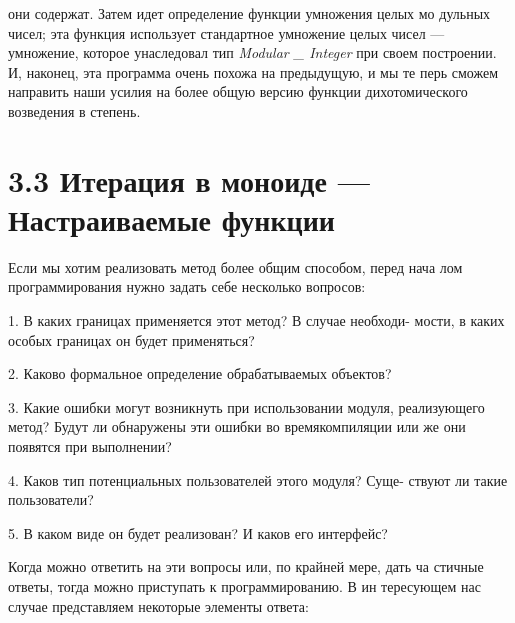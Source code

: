 \documentclass{mai_book}
\begin{document}
\noindent они содержат. Затем идет определение функции умножения целых мо­
дульных чисел; эта функция использует стандартное умножение целых
чисел — умножение, которое унаследовал тип {\it Modular \_ Integer} при своем
построении.
И, наконец, эта программа очень похожа на предыдущую, и мы те­
перь сможем направить наши усилия на более общую версию функции
дихотомического возведения в степень.

\section{ 3.3 Итерация в моноиде — Настраиваемые функции}


\noindent Если мы хотим реализовать метод более общим способом, перед нача­
лом программирования нужно задать себе несколько вопросов:
\begin{center}
\parbox{12cm}{
1. В каких границах применяется этот метод? В случае необходи­-
   мости, в каких особых границах он будет применяться?

2. Каково формальное определение обрабатываемых объектов?

3. Какие ошибки могут возникнуть при использовании модуля, ре­ализующего метод?           Будут ли обнаружены эти ошибки во времякомпиляции или же они появятся при выполнении?

4. Каков тип потенциальных пользователей этого модуля? Суще­-
   ствуют ли такие пользователи?

5. В каком виде он будет реализован? И каков его интерфейс?
}
\end{center}
Когда можно ответить на эти вопросы или, по крайней мере, дать ча­
стичные ответы, тогда можно приступать к программированию. В ин­
тересующем нас случае представляем некоторые элементы ответа:
\end{document}

